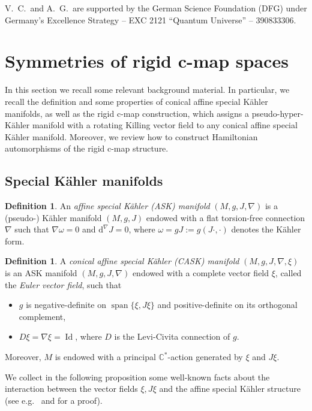 \documentclass{article}
\theoremstyle{definition}
\newtheorem{definition}[theorem]{Definition}
\DeclareMathOperator{\Id}{Id}
\DeclareMathOperator{\spn}{span}
\newcommand{\C}{\mathbb{C}}
\renewcommand{\d}{\mathrm{d}}
\begin{document}
    V.\ C.\ and A.\ G.\ are supported by the German Science Foundation (DFG) under Germany’s Excellence Strategy – EXC 2121 “Quantum Universe” – 390833306.
    
    \section{Symmetries of rigid c-map spaces}\label{sec:sym_rigid}
 
    In this section we recall some relevant background material. In particular, we recall the definition and some properties of conical affine special K\"ahler manifolds, as well as the rigid c-map construction, which assigns a pseudo-hyper-K\"ahler manifold with a rotating Killing vector field to any conical affine special K\"ahler manifold. Moreover, we review how to construct Hamiltonian automorphisms of the rigid c-map structure.
    
    \subsection{Special K\"ahler manifolds}
	
	\begin{definition}
		An \emph{affine special K\"ahler (ASK) manifold} $(M,g,J,\nabla)$ is a (pseudo-) K\"ahler manifold $(M,g,J)$ endowed with a flat torsion-free connection $\nabla$ such that $\nabla\omega=0$ and $\d^\nabla J=0$, where $\omega=gJ:=g(J\cdot,\cdot)$ denotes the K\"ahler form.
	\end{definition}
 
        \begin{definition}
		A \emph{conical affine special K\"ahler (CASK) manifold} $(M,g,J,\nabla,\xi)$ is an ASK manifold $(M,g,J,\nabla)$ endowed with a complete vector field $\xi$, called the \emph{Euler vector field}, such that \begin{itemize}
			\itemsep 0em
			\item $g$ is negative-definite on $\spn\{\xi,J\xi\}$ and positive-definite on its orthogonal complement,
			\item $D\xi=\nabla\xi=\Id$, where $D$ is the Levi-Civita connection of $g$.
		\end{itemize} Moreover, $M$ is endowed with a principal $\C^*$-action generated by $\xi$ and $J\xi$.
	\end{definition}

	We collect in the following proposition some well-known facts about the interaction between the vector fields $\xi,J\xi$ and the affine special K\"ahler structure (see e.g.\ \cite[Proposition~3]{CM09} and \cite[page~652]{CHM12} for a proof).
	
\end{document}
